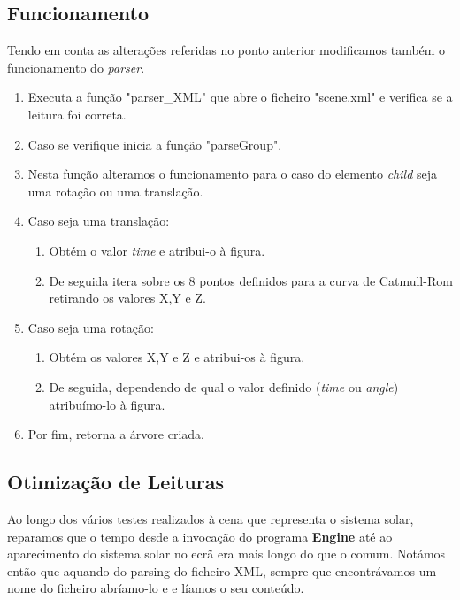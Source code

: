\documentclass[a4paper]{article}
\begin{document}
\subsection{Funcionamento}
\label{sec:funcionamento}

Tendo em conta as alterações referidas no ponto anterior modificamos também o funcionamento do \textit{parser}.

\ttfamily
\begin{enumerate}
  \item Executa a função "parser\_XML" que abre o ficheiro "scene.xml" e verifica se a leitura foi correta.
  \item Caso se verifique inicia a função "parseGroup".
  \item Nesta função alteramos o funcionamento para o caso do elemento \textit{child} seja uma rotação ou uma translação.
  \item Caso seja uma translação:
  \begin{enumerate}
    \item Obtém o valor \textit{time} e atribui-o à figura.
    \item De seguida itera sobre os 8 pontos definidos para a curva de Catmull-Rom retirando os valores X,Y e Z.
  \end{enumerate}
  \item Caso seja uma rotação:
  \begin{enumerate}
    \item Obtém os valores X,Y e Z e atribui-os à figura.
    \item De seguida, dependendo de qual o valor definido (\textit{time} ou \textit{angle}) atribuímo-lo à figura.
  \end{enumerate}
  \item Por fim, retorna a árvore criada.
\end{enumerate}
\rmfamily

\subsection{Otimização de Leituras}
\label{sec:otimização}

Ao longo dos vários testes realizados à cena que representa o sistema solar, reparamos que o tempo desde a invocação do programa \textbf{Engine} até ao aparecimento do sistema solar no ecrã era mais longo do que o comum. Notámos então que aquando do parsing do ficheiro XML, sempre que encontrávamos um nome do ficheiro abríamo-lo e e líamos o seu conteúdo.
\end{document}
